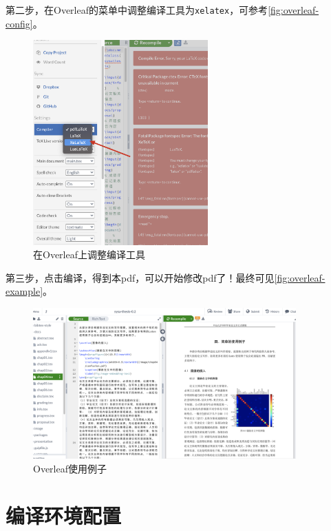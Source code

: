第二步，在Overleaf的菜单中调整编译工具为\texttt{xelatex}，可参考\autoref{fig:overleaf-config}。

\begin{figure}[h]
	\centering
	\includegraphics[width=0.6\textwidth]{image/chap03/overleaf-config.jpg}
	\caption{在Overleaf上调整编译工具}
 	\label{fig:overleaf-config}
\end{figure}


第三步，点击编译，得到本pdf，可以开始修改pdf了！最终可见\autoref{fig:overleaf-example}。


\begin{figure}[h]
	\centering
	\includegraphics[width=0.9\textwidth]{image/chap03/overleaf-example.jpg}
	\caption{Overleaf使用例子}
 	\label{fig:overleaf-example}
\end{figure}



\section{编译环境配置}

